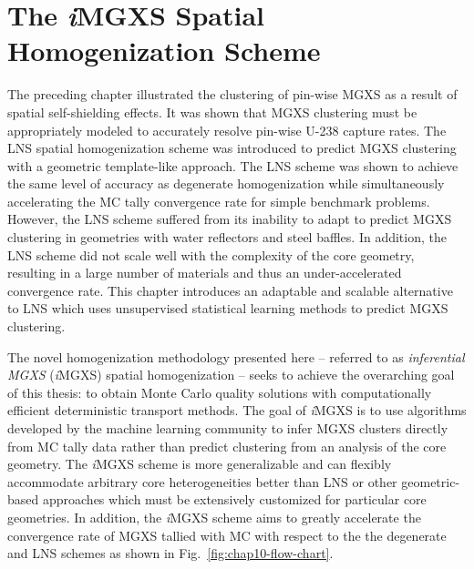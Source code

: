 \chapter{The \textit{i}MGXS Spatial Homogenization Scheme}
\label{chap:unsupervised}

The preceding chapter illustrated the clustering of pin-wise \ac{MGXS} as a result of spatial self-shielding effects. It was shown that \ac{MGXS} clustering must be appropriately modeled to accurately resolve pin-wise U-238 capture rates. The \ac{LNS} spatial homogenization scheme was introduced to predict \ac{MGXS} clustering with a geometric template-like approach. The \ac{LNS} scheme was shown to achieve the same level of accuracy as degenerate homogenization while simultaneously accelerating the \ac{MC} tally convergence rate for simple benchmark problems. However, the \ac{LNS} scheme suffered from its inability to adapt to predict \ac{MGXS} clustering in geometries with water reflectors and steel baffles. In addition, the \ac{LNS} scheme did not scale well with the complexity of the core geometry, resulting in a large number of materials and thus an under-accelerated convergence rate. This chapter introduces an adaptable and scalable alternative to \ac{LNS} which uses unsupervised statistical learning methods to predict \ac{MGXS} clustering.

The novel homogenization methodology presented here -- referred to as \textit{inferential \ac{MGXS}} (\textit{i}\ac{MGXS}) spatial homogenization -- seeks to achieve the overarching goal of this thesis: to obtain Monte Carlo quality solutions with computationally efficient deterministic transport methods. The goal of \textit{i}\ac{MGXS} is to use algorithms developed by the machine learning community to infer \ac{MGXS} clusters directly from \ac{MC} tally data rather than predict clustering from an analysis of the core geometry. The \textit{i}\ac{MGXS} scheme is more generalizable and can flexibly accommodate arbitrary core heterogeneities better than \ac{LNS} or other geometric-based approaches which must be extensively customized for particular core geometries. In addition, the \textit{i}\ac{MGXS} scheme aims to greatly accelerate the convergence rate of \ac{MGXS} tallied with \ac{MC} with respect to the the degenerate and \ac{LNS} schemes as shown in Fig.~\ref{fig:chap10-flow-chart}.


